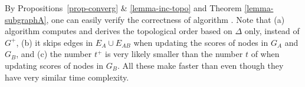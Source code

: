 
By Propositions~\ref{prop-converg} \& \ref{lemma-inc-topo} and Theorem \ref{lemma-subgraphA}, one can easily verify the correctness of algorithm \inctwprscc.
%
Note that  (a) algorithm \inctwprscc computes \sccs and derives the topological order based  on $\Delta$ only, instead of $G^{+}$,
(b) it skips edges in $E_A\cup E_{AB}$ when updating the scores of nodes in $G_A$ and $G_B$, and
(c) the number $t^+$ is very likely smaller than the number $t$ of \twprscc when updating scores of nodes in $G_B$.
%
All these make \inctwprscc faster than \twprscc even though they have very similar time complexity.



